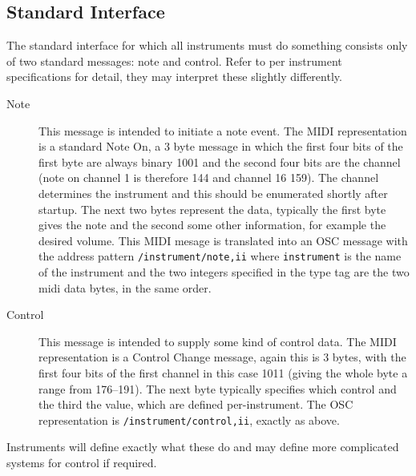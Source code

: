 \documentclass{article}
\begin{document}
\subsection{Standard Interface}
The standard interface for which all instruments must do something consists only of two standard messages: note and control.
Refer to per instrument specifications for detail, they may interpret these slightly differently.
\begin{description} 
	\item [Note] This message is intended to initiate a note event. The MIDI representation is a standard Note On, a 3 byte message in which the first
			   four bits of the first byte are always binary 1001 and the second four bits are the channel (note on channel 1 is therefore 144 and
			    channel 16 159). The channel determines the instrument
			   and this should be enumerated shortly after startup. The next two bytes represent the data, typically the first byte gives the
			   note and the second some other information, for example the desired volume. This MIDI mesage is translated into an OSC message
			   with the address pattern \texttt{/instrument/note,ii} where \texttt{instrument} is the name of the instrument and the two integers 
			   specified in the type tag are the two midi data bytes, in the same order.
	\item [Control] This message is intended to supply some kind of control data. The MIDI representation is a Control Change message, again 
			       this is 3 bytes, with the first four bits of the first channel in this case 1011 (giving the whole byte a range from 176--191). The 
			       next byte typically specifies which control and the third the value, which are defined per-instrument.
			       The OSC representation is \texttt{/instrument/control,ii}, exactly as above.
			 
\end{description}

Instruments will define exactly what these do and may define more complicated systems for control if required.
\end{document}
